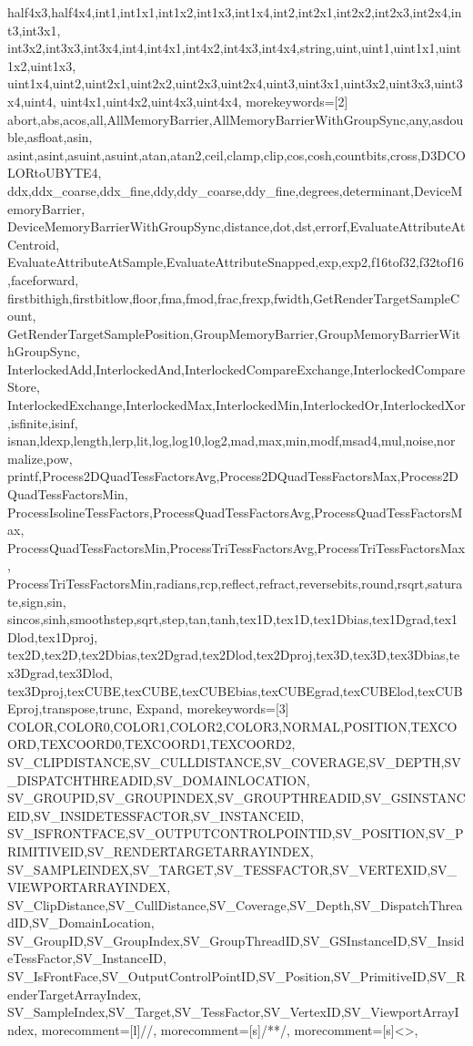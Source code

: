 {{    half4x3,half4x4,int1,int1x1,int1x2,int1x3,int1x4,int2,int2x1,int2x2,int2x3,int2x4,int3,int3x1,
    int3x2,int3x3,int3x4,int4,int4x1,int4x2,int4x3,int4x4,string,uint,uint1,uint1x1,uint1x2,uint1x3,
    uint1x4,uint2,uint2x1,uint2x2,uint2x3,uint2x4,uint3,uint3x1,uint3x2,uint3x3,uint3x4,uint4,
    uint4x1,uint4x2,uint4x3,uint4x4},
  morekeywords=[2]{%
    abort,abs,acos,all,AllMemoryBarrier,AllMemoryBarrierWithGroupSync,any,asdouble,asfloat,asin,
    asint,asint,asuint,asuint,atan,atan2,ceil,clamp,clip,cos,cosh,countbits,cross,D3DCOLORtoUBYTE4,
    ddx,ddx_coarse,ddx_fine,ddy,ddy_coarse,ddy_fine,degrees,determinant,DeviceMemoryBarrier,
    DeviceMemoryBarrierWithGroupSync,distance,dot,dst,errorf,EvaluateAttributeAtCentroid,
    EvaluateAttributeAtSample,EvaluateAttributeSnapped,exp,exp2,f16tof32,f32tof16,faceforward,
    firstbithigh,firstbitlow,floor,fma,fmod,frac,frexp,fwidth,GetRenderTargetSampleCount,
    GetRenderTargetSamplePosition,GroupMemoryBarrier,GroupMemoryBarrierWithGroupSync,
    InterlockedAdd,InterlockedAnd,InterlockedCompareExchange,InterlockedCompareStore,
    InterlockedExchange,InterlockedMax,InterlockedMin,InterlockedOr,InterlockedXor,isfinite,isinf,
    isnan,ldexp,length,lerp,lit,log,log10,log2,mad,max,min,modf,msad4,mul,noise,normalize,pow,
    printf,Process2DQuadTessFactorsAvg,Process2DQuadTessFactorsMax,Process2DQuadTessFactorsMin,
    ProcessIsolineTessFactors,ProcessQuadTessFactorsAvg,ProcessQuadTessFactorsMax,
    ProcessQuadTessFactorsMin,ProcessTriTessFactorsAvg,ProcessTriTessFactorsMax,
    ProcessTriTessFactorsMin,radians,rcp,reflect,refract,reversebits,round,rsqrt,saturate,sign,sin,
    sincos,sinh,smoothstep,sqrt,step,tan,tanh,tex1D,tex1D,tex1Dbias,tex1Dgrad,tex1Dlod,tex1Dproj,
    tex2D,tex2D,tex2Dbias,tex2Dgrad,tex2Dlod,tex2Dproj,tex3D,tex3D,tex3Dbias,tex3Dgrad,tex3Dlod,
    tex3Dproj,texCUBE,texCUBE,texCUBEbias,texCUBEgrad,texCUBElod,texCUBEproj,transpose,trunc,
    Expand},
  morekeywords=[3]{%
    COLOR,COLOR0,COLOR1,COLOR2,COLOR3,NORMAL,POSITION,TEXCOORD,TEXCOORD0,TEXCOORD1,TEXCOORD2,
    SV_CLIPDISTANCE,SV_CULLDISTANCE,SV_COVERAGE,SV_DEPTH,SV_DISPATCHTHREADID,SV_DOMAINLOCATION,
    SV_GROUPID,SV_GROUPINDEX,SV_GROUPTHREADID,SV_GSINSTANCEID,SV_INSIDETESSFACTOR,SV_INSTANCEID,
    SV_ISFRONTFACE,SV_OUTPUTCONTROLPOINTID,SV_POSITION,SV_PRIMITIVEID,SV_RENDERTARGETARRAYINDEX,
    SV_SAMPLEINDEX,SV_TARGET,SV_TESSFACTOR,SV_VERTEXID,SV_VIEWPORTARRAYINDEX,
    SV_ClipDistance,SV_CullDistance,SV_Coverage,SV_Depth,SV_DispatchThreadID,SV_DomainLocation,
    SV_GroupID,SV_GroupIndex,SV_GroupThreadID,SV_GSInstanceID,SV_InsideTessFactor,SV_InstanceID,
    SV_IsFrontFace,SV_OutputControlPointID,SV_Position,SV_PrimitiveID,SV_RenderTargetArrayIndex,
    SV_SampleIndex,SV_Target,SV_TessFactor,SV_VertexID,SV_ViewportArrayIndex},
  morecomment=[l]{//},
  morecomment=[s]{/*}{*/},
  morecomment=[s]{<}{>},
}



